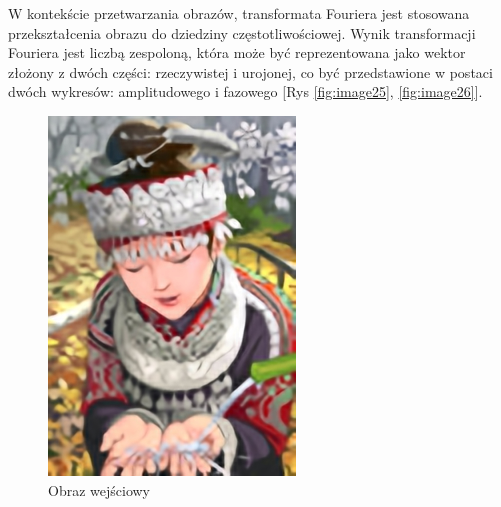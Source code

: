 W kontekście przetwarzania obrazów, transformata Fouriera jest stosowana przekształcenia obrazu do dziedziny częstotliwościowej. Wynik transformacji Fouriera jest liczbą zespoloną, która może być reprezentowana jako wektor złożony z dwóch części: rzeczywistej i urojonej, co być przedstawione w postaci dwóch wykresów: amplitudowego i fazowego [Rys \ref{fig:image25}, \ref{fig:image26}].

\begin{figure}[ht]
    \centering
    \begin{minipage}[t]{0.325\linewidth}
        \includegraphics[width=\linewidth]{Rozdziały/02.Podstawy_teoretyczne/Obrazy/comic_DWSR_x4.png}
        \caption{Obraz wejściowy}
        \label{fig:image24}
    \end{minipage}
    \begin{minipage}[t]{0.325\linewidth}

\end{minipage}
\end{figure}
